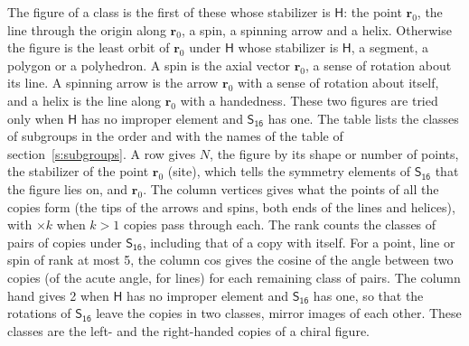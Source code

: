 \documentclass[10pt,a4paper]{article}
\numberwithin{equation}{section}
\newcommand{\grp}[1]{\mathsf{#1}}
\newcommand{\pointr}{\mathbf{r}}
\begin{document}
\leavevmode\label{n:head.figure}The figure of a class is the first of these whose stabilizer is $\grp{H}$: the point $\pointr_0$, the line through the origin along $\pointr_0$, a spin, a spinning arrow and a helix. Otherwise the figure is the least orbit of $\pointr_0$ under $\grp{H}$ whose stabilizer is $\grp{H}$, a segment, a polygon or a polyhedron. A spin is the axial vector $\pointr_0$, a sense of rotation about its line. A spinning arrow is the arrow $\pointr_0$ with a sense of rotation about itself, and a helix is the line along $\pointr_0$ with a handedness. These two figures are tried only when $\grp{H}$ has no improper element and $\grp{S_{16}}$ has one. The table lists the classes of subgroups in the order and with the names of the table of section~\ref{s:subgroups}. \label{n:head.site}A row gives $N$, the figure by its shape or number of points, the stabilizer of the point $\pointr_0$ (site), which tells the symmetry elements of $\grp{S_{16}}$ that the figure lies on, and $\pointr_0$. \label{n:head.vertices}The column vertices gives what the points of all the copies form (the tips of the arrows and spins, both ends of the lines and helices), with ${\times}k$ when $k > 1$ copies pass through each. \label{n:head.rank}The rank counts the classes of pairs of copies under $\grp{S_{16}}$, including that of a copy with itself. \label{n:head.cos}For a point, line or spin of rank at most 5, the column cos gives the cosine of the angle between two copies (of the acute angle, for lines) for each remaining class of pairs. \label{n:head.hand}The column hand gives 2 when $\grp{H}$ has no improper element and $\grp{S_{16}}$ has one, so that the rotations of $\grp{S_{16}}$ leave the copies in two classes, mirror images of each other. These classes are the left- and the right-handed copies of a chiral figure.
\end{document}
